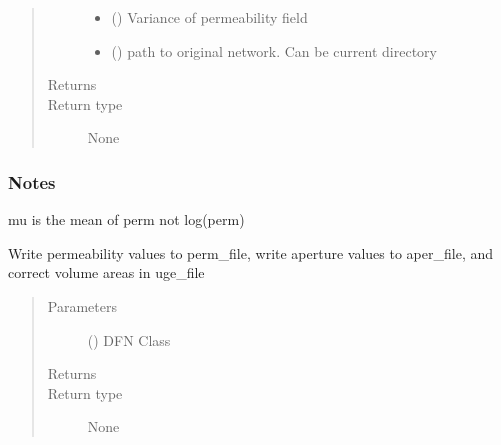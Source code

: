 \documentclass[letterpaper,10pt,english]{sphinxmanual}
\begin{document}
\begin{fulllineitems}
\begin{fulllineitems}
\begin{quote}
\begin{description}
\begin{itemize}
\item {} 
 () \textendash{} Variance of permeability field

\item {} 
 () \textendash{} path to original network. Can be current directory

\end{itemize}

\item[{Returns}] \leavevmode


\item[{Return type}] \leavevmode
None

\end{description}\end{quote}
\subsubsection*{Notes}

mu is the mean of perm not log(perm)

\end{fulllineitems}


\begin{fulllineitems}
\label{\detokenize{pydfnworks:pydfnworks.general.dfnworks.DFNWORKS.write_perms_and_correct_volumes_areas}}
Write permeability values to perm\_file, write aperture values to aper\_file, and correct volume areas in uge\_file
\begin{quote}\begin{description}
\item[{Parameters}] \leavevmode
{} () \textendash{} DFN Class

\item[{Returns}] \leavevmode


\item[{Return type}] \leavevmode
None

\end{description}\end{quote}

\end{fulllineitems}
\end{fulllineitems}
\end{document}
